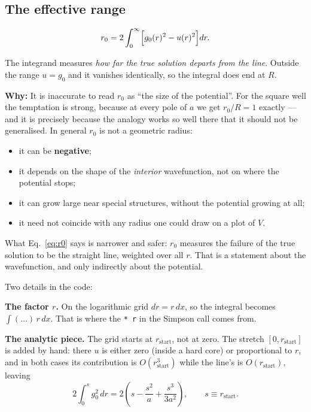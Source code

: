 \documentclass[11pt,a4paper]{article}
\newcommand{\why}[1]{\medskip\noindent\textbf{Why:} #1\medskip}
\begin{document}
\subsection{The effective range}
\label{sec:r0}

\begin{equation}
  r_0 = 2\int_0^\infty \Bigl[g_0(r)^2 - u(r)^2\Bigr]dr .
  \label{eq:r0}
\end{equation}

The integrand measures \emph{how far the true solution departs from the line}.
Outside the range $u = g_0$ and it vanishes identically, so the integral does
end at $R$.

\why{It is inaccurate to read $r_0$ as ``the size of the potential''. For the
square well the temptation is strong, because at every pole of $a$ we get
$r_0/R = 1$ exactly --- and it is precisely because the analogy works so well
there that it should not be generalised. In general $r_0$ is not a geometric
radius:
\begin{itemize}
  \item it can be \textbf{negative};
  \item it depends on the shape of the \emph{interior} wavefunction, not on
        where the potential stops;
  \item it can grow large near special structures, without the potential
        growing at all;
  \item it need not coincide with any radius one could draw on a plot of $V$.
\end{itemize}
What Eq.~\eqref{eq:r0} says is narrower and safer: $r_0$ measures the failure of
the true solution to be the straight line, weighted over all $r$. That is a
statement about the wavefunction, and only indirectly about the potential.}

Two details in the code:

\textbf{The factor $r$.} On the logarithmic grid $dr = r\,dx$, so the integral
becomes $\int(\dots)\,r\,dx$. That is where the \texttt{* r} in the Simpson call
comes from.

\textbf{The analytic piece.} The grid starts at $r_{\text{start}}$, not at zero.
The stretch $[0, r_{\text{start}}]$ is added by hand: there $u$ is either zero
(inside a hard core) or proportional to $r$, and in both cases its contribution
is $O(r_{\text{start}}^3)$ while the line's is $O(r_{\text{start}})$, leaving
\begin{equation}
  2\int_0^{s}g_0^2\,dr = 2\left(s - \frac{s^2}{a} + \frac{s^3}{3a^2}\right),
  \qquad s \equiv r_{\text{start}}.
\end{equation}
\end{document}
